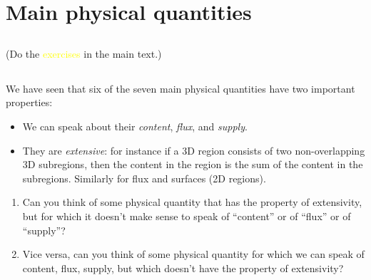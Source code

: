 \documentclass[a4paper,12pt,%
onecolumn,oneside,%
british%
]{memoir}
\renewcommand*{\|}[1][]{\nonscript\:#1\vert\nonscript\:\mathopen{}}
\begin{document}



\printpagenotes*
\clearpage
\chapter{Main physical quantities}
\label{cha:stuff}
\setcounter{section}{-1}

\section{}
(Do the \textcolor{yellow}{exercises} in the main text.)



\section{}
\label{sec:extensive_vs_meas}

We have seen that six of the seven main physical quantities have two important properties:
\begin{itemize}[nosep]
\item We can speak about their \emph{content}, \emph{flux}, and \emph{supply}.
\item They are \emph{extensive}: for instance if a 3D region consists of two non-overlapping 3D subregions, then the content in the region is the sum of the content in the subregions. Similarly for flux and surfaces (2D regions).
\end{itemize}

\begin{enumerate}[exerc]
\item Can you think of some physical quantity that has the property of extensivity, but for which it doesn't make sense to speak of \enquote{content} or of \enquote{flux} or of \enquote{supply}?

\item Vice versa, can you think of some physical quantity for which we can speak of content, flux, supply, but which doesn't have the property of extensivity?
\end{enumerate}
\end{document}
